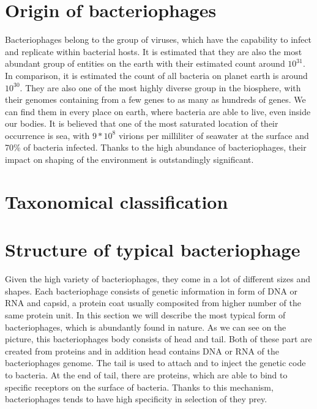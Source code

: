 \section{Origin of bacteriophages}
Bacteriophages belong to the group of viruses, which have the capability to infect and replicate within bacterial hosts.
It is estimated that they are also the most abundant group of entities on the earth with their estimated count around $10^{31}$.
In comparison, it is estimated the count of all bacteria on planet earth is around $10^{30}$.
They are also one of the most highly diverse group in the biosphere, with their genomes containing from a few genes to as many as hundreds of genes.
We can find them in every place on earth, where bacteria are able to live, even inside our bodies.
It is believed that one of the most saturated location of their occurrence is sea, with $9*10^{8}$ virions per milliliter of seawater at the surface and 70\% of bacteria infected. %
Thanks to the high abundance of bacteriophages, their impact on shaping of the environment is outstandingly significant. %

\section{Taxonomical classification}

\section{Structure of typical bacteriophage}
Given the high variety of bacteriophages, they come in a lot of different sizes and shapes.
Each bacteriophage consists of genetic information in form of DNA or RNA and capsid, a protein coat usually composited from higher number of the same protein unit.
In this section we will describe the most typical form of bacteriophages, which is abundantly found in nature.
As we can see on the picture, this bacteriophages body consists of head and tail.
Both of these part are created from proteins and in addition head contains DNA or RNA of the bacteriophages genome.
The tail is used to attach and to inject the genetic code to bacteria.
At the end of tail, there are proteins, which are able to bind to specific receptors on the surface of bacteria.
Thanks to this mechanism, bacteriophages tends to have high specificity in selection of they prey.


